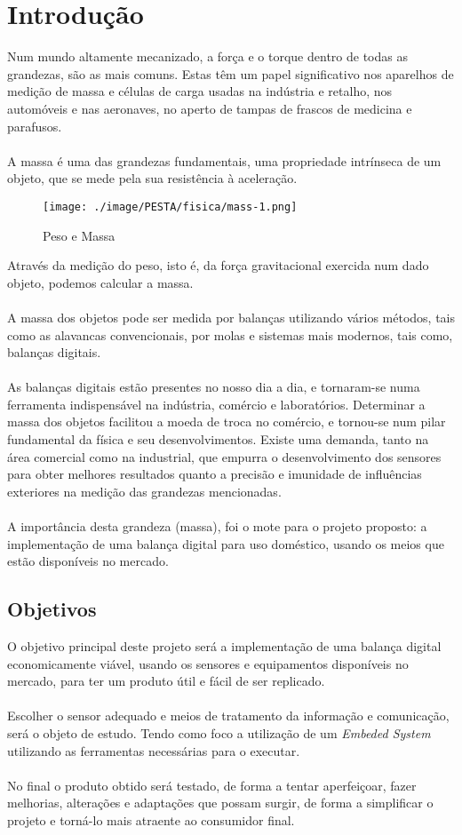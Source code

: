 \chapter{Introdução}
Num mundo altamente mecanizado, a força e o torque dentro de todas as grandezas, são as mais comuns. Estas têm um papel significativo nos aparelhos de medição de massa e células de carga usadas na indústria e retalho, nos automóveis e nas aeronaves, no aperto de tampas de frascos de medicina e parafusos.\cite{book-9}
\\
\\
A massa é uma das grandezas fundamentais, uma propriedade intrínseca de um objeto, que se mede pela sua resistência à aceleração.\cite{book-2}
\begin{figure}[H]
	\centering
	\texttt{[image: ./image/PESTA/fisica/mass-1.png]}
	\caption{Peso e Massa}
	\label{mass}
\end{figure}
Através da medição do peso, isto é, da força gravitacional exercida num dado objeto, podemos calcular a massa. \cite{book-2}
\\
\\
A massa dos objetos pode ser medida por balanças utilizando vários métodos, tais como as alavancas convencionais, por  molas e sistemas mais modernos, tais como, balanças digitais.
\\
\\
As balanças digitais estão presentes no nosso dia a dia, e tornaram-se numa ferramenta indispensável na indústria, comércio e laboratórios. Determinar a massa dos objetos facilitou a moeda de troca no comércio, e tornou-se num pilar fundamental da física e seu desenvolvimentos. Existe uma demanda, tanto na área comercial como na industrial, que empurra o desenvolvimento dos sensores para obter melhores resultados quanto a precisão e imunidade de influências exteriores na medição das grandezas mencionadas.\\
\\
A importância desta grandeza (massa), foi o mote para o projeto proposto: a implementação de uma balança digital para uso doméstico, usando os meios que estão disponíveis no mercado.
\section{Objetivos}
O objetivo principal deste projeto será a implementação de uma balança digital economicamente viável, usando os sensores e equipamentos disponíveis no mercado, para ter um produto útil e fácil de ser replicado.
\\
\\
Escolher o sensor adequado e meios de tratamento da informação e comunicação, será o objeto de estudo. Tendo como foco a utilização de um \textit{Embeded System} utilizando as ferramentas necessárias para o executar.
\\
\\
No final o produto obtido será testado, de forma a tentar aperfeiçoar, fazer melhorias, alterações e adaptações que possam surgir, de forma a simplificar o projeto e torná-lo mais atraente ao consumidor final.
